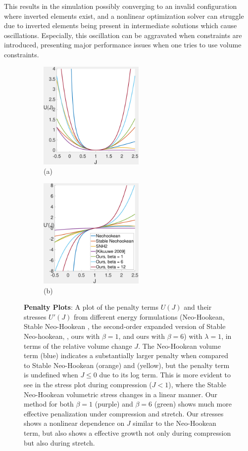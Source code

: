 This results in the simulation possibly converging to an invalid configuration where inverted elements exist, 
and a nonlinear optimization solver can struggle due to inverted elements being present in intermediate solutions which cause oscillations.
Especially, this oscillation can be aggravated when constraints are introduced, presenting major performance issues when one tries to use volume constraints. 

\begin{figure}[t] 
	\centering
	\begin{subfigure}{.49\linewidth}
		\centering \includegraphics[width=2.0in]{images/pen_plot.pdf}
		\caption*{(a)}
		\label{sfig:energy_plot}
	\end{subfigure}%
	\begin{subfigure}{.49\linewidth}
		\centering \includegraphics[width=2.0in]{images/stress_plot.pdf}
		\caption*{(b)}
		\label{sfig:stress_plot}
	\end{subfigure}%
	\caption{\textbf{Penalty Plots}: A plot of the penalty terms $U(J)$ and their stresses $U'(J)$ from different
		energy formulations (Neo-Hookean, Stable Neo-Hookean \cite{Smith:2018}, the second-order expanded version of Stable Neo-hookean, \cite{kikuuwe:2009},
		ours with $\beta=1$, and ours with $\beta=6$) with $\lambda = 1$, in terms of the relative volume change $J$. 
		The Neo-Hookean volume term (blue) indicates a substantially larger penalty
		when compared to Stable Neo-Hookean (orange) 
		and \cite{kikuuwe:2009} (yellow), but the penalty term is undefined when $J \leq 0$ due to its log term.
		This is more evident to see in the stress plot during compression ($J < 1$), where the Stable
		Neo-Hookean volumetric stress changes in a linear manner. Our method for both $\beta=1$ (purple) and $\beta=6$ (green) shows much more effective penalization under compression and stretch. Our stresses shows a nonlinear dependence on $J$
		similar to the Neo-Hookean term, but also shows a effective growth not only during compression but also during stretch. }
	\label{fig:penalty_plots}
\end{figure}

